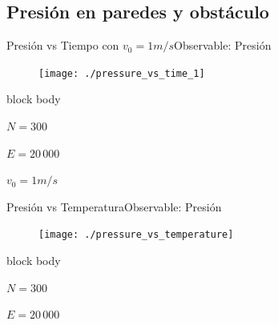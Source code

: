 \documentclass{beamer}
\begin{document}
        \subsection{Presión en paredes y obstáculo}

            \begin{frame}{Presión vs Tiempo con $v_0=1m/s$}{Observable: Presión}
                    \begin{figure}[H!]
                        \texttt{[image: ./pressure\_vs\_time\_1]}
                        \label{fig:p_1}
                    \end{figure}
                    \begin{beamercolorbox}[sep=5pt,center]{block body}
                        \begin{minipage}[t]{0.3\textwidth}
                            \centering
                            \small{$N=300$}
                        \end{minipage}
                        \hfill
                        \begin{minipage}[t]{0.3\textwidth}
                            \centering
                            \small{$E=20\,000$}
                        \end{minipage}
                        \hfill
                        \begin{minipage}[t]{0.3\textwidth}
                            \centering
                            \small{$v_0 = 1 m/s$}
                        \end{minipage}
                    \end{beamercolorbox}
            \end{frame}

            \begin{frame}{Presión vs Temperatura}{Observable: Presión}
                \begin{figure}[H!]
                    \texttt{[image: ./pressure\_vs\_temperature]}
                    \label{fig:p_vs_t}
                \end{figure}
                \begin{beamercolorbox}[sep=5pt,center]{block body}
                    \begin{minipage}[t]{0.3\textwidth}
                        \centering
                        \small{$N=300$}
                    \end{minipage}
                    \hfill
                    \begin{minipage}[t]{0.3\textwidth}
                        \centering
                        \small{$E=20\,000$}
                    \end{minipage}
                \end{beamercolorbox}
            \end{frame}
\end{document}
